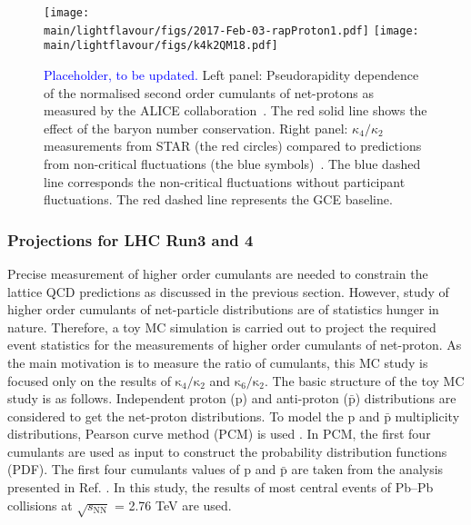\begin{figure}[h]
\begin{center}
\texttt{[image: \\main/lightflavour/figs/2017-Feb-03-rapProton1.pdf]}
\texttt{[image: \\main/lightflavour/figs/k4k2QM18.pdf]}
\end{center}
\caption{\textcolor{blue}{Placeholder, to be updated.} Left panel: Pseudorapidity dependence of the normalised second order cumulants of net-protons as measured by the ALICE collaboration~\cite{Rustamov:2017lio}. The red solid line shows the effect of the baryon number conservation. Right panel: $\kappa_{4}/\kappa_{2}$ measurements from STAR (the red circles) compared to predictions from non-critical fluctuations (the blue symbols)~\cite{Braun-Munzinger:2018yru}. The blue dashed line corresponds the non-critical fluctuations without participant fluctuations. The red dashed line represents the GCE baseline.}  
\label{netpALICE_STAR}
\end{figure}



\subsubsection{Projections for LHC Run3 and 4}
Precise measurement of higher order cumulants are needed to constrain the lattice QCD predictions as discussed in the previous section. However, study of higher order cumulants of net-particle distributions are of statistics hunger in nature. Therefore, a toy MC simulation is carried out to project the required event statistics for the measurements of higher order cumulants of net-proton. As the main motivation is to measure the ratio of cumulants, this MC study is focused only on the results of $\mathrm{\kappa}_{4}/\mathrm{\kappa}_{2}$ and $\mathrm{\kappa}_{6}/\mathrm{\kappa}_{2}$. The basic structure of the toy MC study is as follows. Independent proton (p) and anti-proton ($\mathrm{\bar{p}}$) distributions are considered to get the net-proton distributions. To model the p and $\mathrm{\bar{p}}$ multiplicity distributions, Pearson curve method (PCM) is used \cite{Behera:2017xwg}. In PCM, the first four cumulants are used as input to construct the probability distribution functions (PDF).  The first four cumulants values of p and $\mathrm{\bar{p}}$ are taken from the analysis presented in Ref. \cite{Behera:2018wqk}. In this study, the results of most central events of Pb--Pb collisions at $\sqrt{s_{\mathrm{NN}}}$ = 2.76 TeV are used.

